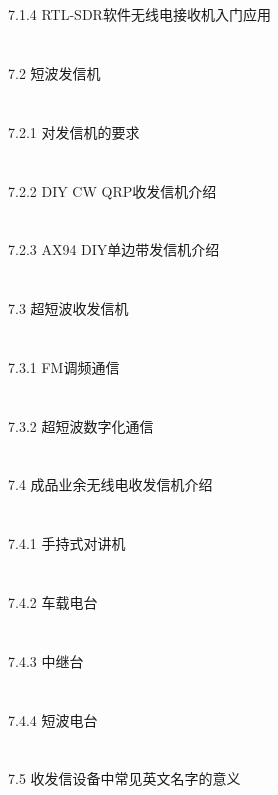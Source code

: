 \documentclass[12pt,UTF8]{ctexbook}
\begin{document}
\section{}7.1.4 RTL-SDR软件无线电接收机入门应用
\section{}7.2 短波发信机
\section{}7.2.1 对发信机的要求
\section{}7.2.2 DIY CW QRP收发信机介绍
\section{}7.2.3 AX94 DIY单边带发信机介绍
\section{}7.3 超短波收发信机
\section{}7.3.1 FM调频通信
\section{}7.3.2 超短波数字化通信
\section{}7.4 成品业余无线电收发信机介绍
\section{}7.4.1 手持式对讲机
\section{}7.4.2 车载电台
\section{}7.4.3 中继台
\section{}7.4.4 短波电台
\section{}7.5 收发信设备中常见英文名字的意义
\end{document}
